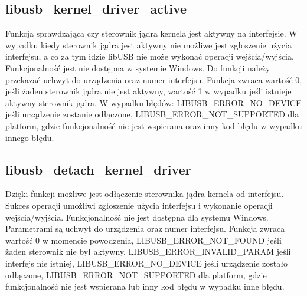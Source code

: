 \documentclass{BscUS}
\begin{document}
\subsection{libusb\_kernel\_driver\_active}
Funkcja sprawdzająca czy sterownik jądra kernela jest aktywny na interfejsie.
\newline
W wypadku kiedy sterownik jądra jest aktywny nie możliwe jest zgłoszenie użycia interfejsu, a co za tym idzie libUSB nie może wykonać operacji wejścia/wyjścia.
\newline
Funkcjonalność jest nie dostępna w systemie Windows.
\newline
Do funkcji należy przekazać uchwyt do urządzenia oraz numer interfejsu.
\newline
Funkcja zwraca wartość 0, jeśli żaden sterownik jądra nie jest aktywny, wartość 1 w wypadku jeśli istnieje aktywny sterownik jądra.
\newline
W wypadku błędów: LIBUSB\_ERROR\_NO\_DEVICE jeśli urządzenie zostanie odłączone, LIBUSB\_ERROR\_NOT\_SUPPORTED dla platform, gdzie funkcjonalność nie jest wspierana oraz inny kod błędu w wypadku innego błędu.
\subsection{libusb\_detach\_kernel\_driver}
Dzięki funkcji możliwe jest odłączenie sterownika jądra kernela od interfejsu.
\newline
Sukces operacji umożliwi zgłoszenie użycia interfejsu i wykonanie operacji wejścia/wyjścia.
\newline
Funkcjonalność nie jest dostępna dla systemu Windows.
\newline
Parametrami są uchwyt do urządzenia oraz numer interfejsu.
\newline
Funkcja zwraca wartość 0 w momencie powodzenia, LIBUSB\_ERROR\_NOT\_FOUND jeśli żaden sterownik nie był aktywny, LIBUSB\_ERROR\_INVALID\_PARAM jeśli interfejs nie istniej, LIBUSB\_ERROR\_NO\_DEVICE jeśli urządzenie zostało odłączone, LIBUSB\_ERROR\_NOT\_SUPPORTED dla platform, gdzie funkcjonalność nie jest wspierana lub inny kod błędu w wypadku inne błędu.
\end{document}
